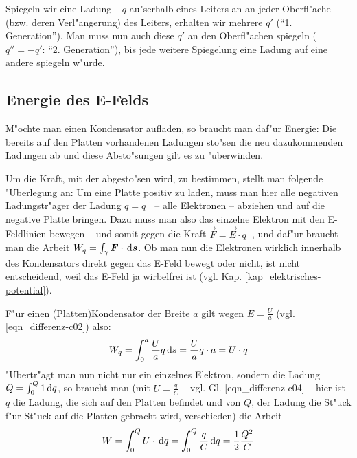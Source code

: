 \begin{Wichtig}
   Spiegeln wir eine Ladung $-q$ au"serhalb eines Leiters an an jeder
   Oberfl"ache (bzw. deren Verl"angerung) des Leiters, erhalten wir
   mehrere $q'$ ("`1. Generation"'). Man muss nun auch diese $q'$ an
   den Oberfl"achen spiegeln ($q'' = -q'$: "`2. Generation"'), bis
   jede weitere Spiegelung eine Ladung auf eine andere spiegeln
   w"urde.
\end{Wichtig}





\subsection{Energie des E-Felds}
\label{kap_energie-des-e-felds}

M"ochte man einen Kondensator aufladen, so braucht man daf"ur Energie:
Die bereits auf den Platten vorhandenen Ladungen sto"sen die neu
dazukommenden Ladungen ab und diese Absto"sungen gilt es zu
"uberwinden.

Um die Kraft, mit der abgesto"sen wird, zu bestimmen, stellt man
folgende "Uberlegung an: Um eine Platte positiv zu laden, muss man
hier alle negativen Ladungstr"ager der Ladung $q = q^-$ -- alle Elektronen
-- abziehen und auf die negative Platte bringen. Dazu muss man also
das einzelne Elektron mit den E-Feldlinien bewegen -- und somit gegen
die Kraft $\vec F = \vec E \cdot q^-$, und daf"ur braucht man die
Arbeit $W_q = \int_\gamma \boldsymbol{F} \cdot \, \mathrm{d} \boldsymbol{s}$. Ob man nun die
Elektronen wirklich innerhalb des Kondensators direkt gegen das E-Feld
bewegt oder nicht, ist nicht entscheidend, weil das E-Feld ja
wirbelfrei ist (vgl. Kap. \ref{kap_elektrisches-potential}).

F"ur einen (Platten)Kondensator der Breite $a$ gilt wegen $E =
\frac{U}{a}$ (vgl. \eqref{eqn_differenz-c02}) also:
\begin{equation*}
   \label{eqn_differenz-c24}
   W_q = \int_0^a \frac{U}{a}q \, \mathrm{d} s = \frac{U}{a}q \cdot a = U
   \cdot q
\end{equation*}
"Ubertr"agt man nun nicht nur ein einzelnes Elektron, sondern die
Ladung $Q = \int_0^Q 1 \, \mathrm{d} q$, so braucht man (mit $U = \frac{q}{C}$
-- vgl. Gl. \eqref{eqn_differenz-c04} -- hier ist $q$ die Ladung, die
sich auf den Platten befindet und von $Q$, der Ladung die St"uck f"ur
St"uck auf die Platten gebracht wird, verschieden) die Arbeit
\begin{equation*}
   \label{eqn_differenz-c25}
   W 
= \int_0^Q U \cdot \, \mathrm{d} q
= \int_0^Q \frac{q}{C} \, \mathrm{d} q =
   \frac{1}{2} \frac{Q^2}{C}
\end{equation*}


